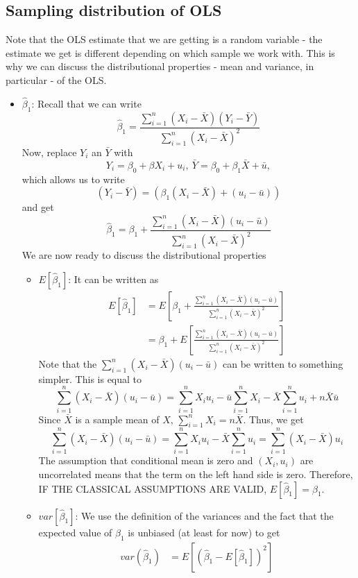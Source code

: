 \documentclass[12pt]{article}
\theoremstyle{definition}
\theoremstyle{property}
\theoremstyle{assumption}
\theoremstyle{example}
\theoremstyle{comment}
\begin{document}
\subsection{Sampling distribution of OLS}
Note that the OLS estimate that we are getting is a random variable - the estimate we get is different depending on which sample we work with. This is why we can discuss the distributional properties - mean and variance, in particular - of the OLS. 
\begin{itemize}
\item $\hat{\beta}_1$: Recall that we can write
\[
\hat{\beta}_1= \frac{\sum_{i=1}^n(X_i-\bar{X})(Y_i-\bar{Y})}{\sum_{i=1}^n(X_i-\bar{X})^2}
\]
Now, replace $Y_i$ an $\bar{Y}$ with 
\[
Y_i =\beta_0 + \beta X_i + u_i, \ \bar{Y} = \beta_0 + \beta_1\bar{X} + \bar{u},
\]
which allows us to write 
\[
(Y_i-\bar{Y}) = (\beta_1(X_i-\bar{X})+(u_i-\bar{u}))
\]
and get
\[
\hat{\beta}_1=\beta_1+  \frac{\sum_{i=1}^n(X_i-\bar{X})(u_i-\bar{u})}{\sum_{i=1}^n(X_i-\bar{X})^2}
\]
We are now ready to discuss the distributional properties
\begin{itemize}
\item $E[\hat{\beta}_1]$: It can be written as
\[
\begin{aligned}
E[\hat{\beta}_1]& = E\left[\beta_1+  \frac{\sum_{i=1}^n(X_i-\bar{X})(u_i-\bar{u})}{\sum_{i=1}^n(X_i-\bar{X})^2}\right]\\
&=\beta_1+ E\left[\frac{\sum_{i=1}^n(X_i-\bar{X})(u_i-\bar{u})}{\sum_{i=1}^n(X_i-\bar{X})^2}\right]
\end{aligned}
\]
Note that the $\sum_{i=1}^n(X_i-\bar{X})(u_i-\bar{u})$ can be written to something simpler. This is equal to
\[
\sum_{i=1}^n(X_i-\bar{X})(u_i-\bar{u})=\sum_{i=1}^nX_iu_i-\bar{u}\sum_{i=1}^n X_i-\bar{X}\sum_{i=1}^nu_i+n\bar{X}\bar{u}
\]
Since $\bar{X}$ is a sample mean of $X$, $\sum_{i=1}^nX_i=n\bar{X}$. Thus, we get
\[
\sum_{i=1}^n(X_i-\bar{X})(u_i-\bar{u})=\sum_{i=1}^nX_iu_i-\bar{X}\sum_{i=1}^nu_i=\sum_{i=1}^n(X_i-\bar{X})u_i
\]
The assumption that conditional mean is zero and $(X_i, u_i)$ are uncorrelated means that the term on the left hand side is zero. Therefore, IF THE CLASSICAL ASSUMPTIONS ARE VALID, $E[\hat{\beta}_1]=\beta_1$.
\item $var[\hat{\beta}_1]$: We use the definition of the variances and the fact that the expected value of $\hat{\beta}_1$ is unbiased (at least for now) to get
\[
\begin{aligned}
var(\hat{\beta}_1)&=E\left[\left(\hat{\beta}_1-E[\hat{\beta}_1]\right)^2\right] \\

\end{aligned}\]
\end{itemize}
\end{itemize}
\end{document}
